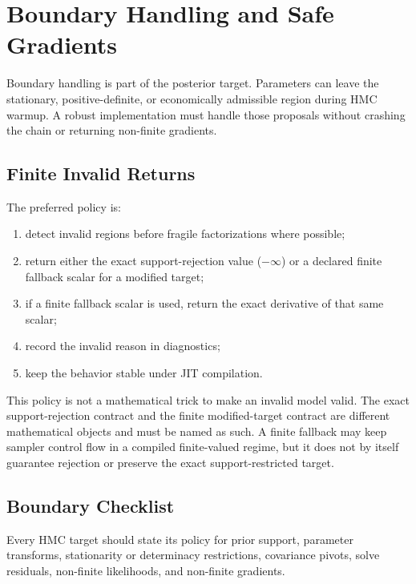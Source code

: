 \chapter{Boundary Handling and Safe Gradients}
\label{ch:bf-boundary-gradients}

Boundary handling is part of the posterior target.  Parameters can leave the
stationary, positive-definite, or economically admissible region during HMC
warmup.  A robust implementation must handle those proposals without crashing
the chain or returning non-finite gradients.

\section{Finite Invalid Returns}
\label{sec:bf-finite-invalid-returns}

The preferred policy is:
\begin{enumerate}[label=(\roman*)]
  \item detect invalid regions before fragile factorizations where possible;
  \item return either the exact support-rejection value ($-\infty$) or a declared finite fallback scalar for a modified target;
  \item if a finite fallback scalar is used, return the exact derivative of that same scalar;
  \item record the invalid reason in diagnostics;
  \item keep the behavior stable under JIT compilation.
\end{enumerate}

This policy is not a mathematical trick to make an invalid model valid. The exact support-rejection contract and the finite modified-target contract are different mathematical objects and must be named as such. A finite fallback may keep sampler control flow in a compiled finite-valued regime, but it does not by itself guarantee rejection or preserve the exact support-restricted target.

\section{Boundary Checklist}
\label{sec:bf-boundary-checklist}

Every HMC target should state its policy for prior support, parameter
transforms, stationarity or determinacy restrictions, covariance pivots, solve
residuals, non-finite likelihoods, and non-finite gradients.

